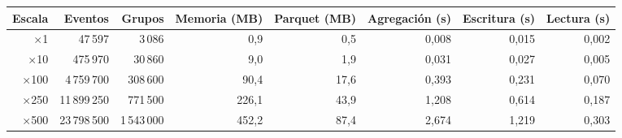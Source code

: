 \begin{tabular}{rrrrrrrr}
\toprule
Escala & Eventos & Grupos & Memoria (MB) & Parquet (MB) & Agregación (s) & Escritura (s) & Lectura (s) \\
\midrule
$\times$1 & 47\,597 & 3\,086 & 0,9 & 0,5 & 0,008 & 0,015 & 0,002 \\
$\times$10 & 475\,970 & 30\,860 & 9,0 & 1,9 & 0,031 & 0,027 & 0,005 \\
$\times$100 & 4\,759\,700 & 308\,600 & 90,4 & 17,6 & 0,393 & 0,231 & 0,070 \\
$\times$250 & 11\,899\,250 & 771\,500 & 226,1 & 43,9 & 1,208 & 0,614 & 0,187 \\
$\times$500 & 23\,798\,500 & 1\,543\,000 & 452,2 & 87,4 & 2,674 & 1,219 & 0,303 \\
\bottomrule
\end{tabular}

